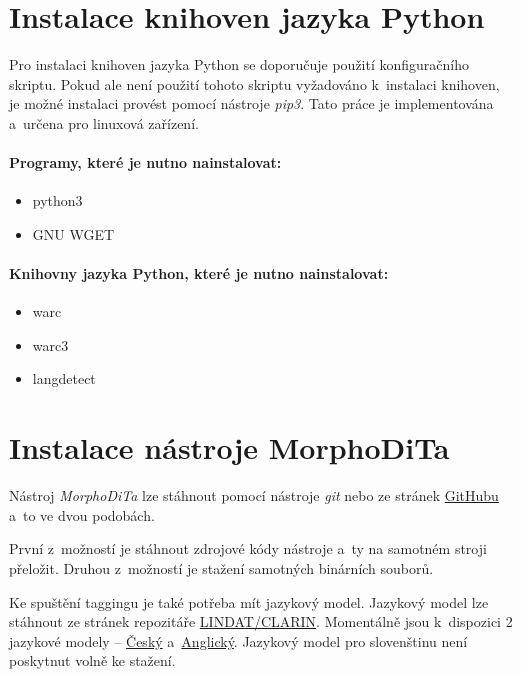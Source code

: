 \section{Instalace knihoven jazyka Python}
Pro instalaci knihoven jazyka Python se doporučuje použití konfiguračního skriptu. Pokud
ale není použití tohoto skriptu vyžadováno k~instalaci knihoven, je možné instalaci provést pomocí nástroje
\textit{pip3}. Tato práce je implementována a~určena pro linuxová zařízení.

\paragraph{Programy, které je nutno nainstalovat:}
\begin{itemize}
    \item python3
    \item GNU WGET
\end{itemize}

\paragraph{Knihovny jazyka Python, které je nutno nainstalovat:}
\begin{itemize}
    \item warc
    \item warc3
    \item langdetect
\end{itemize}

\section{Instalace nástroje MorphoDiTa}
Nástroj \textit{MorphoDiTa} lze stáhnout pomocí nástroje \textit{git} nebo
ze stránek \href{https://github.com/ufal/morphodita}{GitHubu} a~to ve dvou podobách.

První z~možností je stáhnout zdrojové kódy nástroje a~ty na samotném stroji přeložit.
Druhou z~možností je stažení samotných binárních souborů.

Ke spuštění taggingu je také potřeba mít jazykový model. Jazykový model lze stáhnout
ze stránek repozitáře \href{https://lindat.mff.cuni.cz/repository/xmlui/}{LINDAT/CLARIN}.
Momentálně jsou k~dispozici 2 jazykové modely -- \href{https://lindat.mff.cuni.cz/repository/xmlui/handle/11234/1-1836}{Český}
a~\href{https://lindat.mff.cuni.cz/repository/xmlui/}{Anglický}. Jazykový model pro slovenštinu
není poskytnut volně ke stažení.

